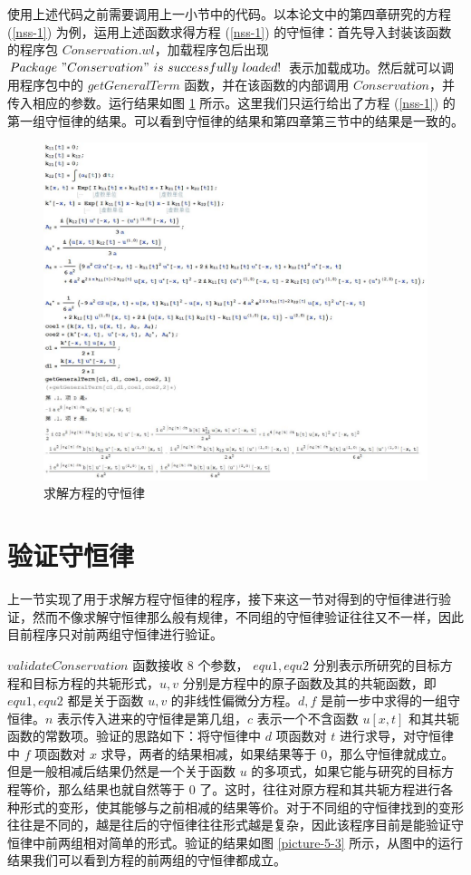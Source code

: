 使用上述代码之前需要调用上一小节中的代码。以本论文中的第四章研究的方程 (\ref{nss-1}) 为例，运用上述函数求得方程 (\ref{nss-1}) 的守恒律：首先导入封装该函数的程序包 $Conservation.wl$，加载程序包后出现 $Package \ "Conservation" \ is \ successfully \  loaded!$ 表示加载成功。然后就可以调用程序包中的 $getGeneralTerm$ 函数，并在该函数的内部调用 $Conservation$，并传入相应的参数。运行结果如图 \ref{picture-5-2} 所示。这里我们只运行给出了方程 (\ref{nss-1}) 的第一组守恒律的结果。可以看到守恒律的结果和第四章第三节中的结果是一致的。
\begin{figure}[!htp]
\centering
\includegraphics[width=\linewidth]{getConservation.jpg}
\caption{求解方程的守恒律}
\label{picture-5-2}
\end{figure}

\section{验证守恒律}
上一节实现了用于求解方程守恒律的程序，接下来这一节对得到的守恒律进行验证，然而不像求解守恒律那么般有规律，不同组的守恒律验证往往又不一样，因此目前程序只对前两组守恒律进行验证。


$validateConservation$ 函数接收 8 个参数， $equ1, equ2$ 分别表示所研究的目标方程和目标方程的共轭形式，$u, v$ 分别是方程中的原子函数及其的共轭函数，即 $equ1, equ2$ 都是关于函数 $u, v$ 的非线性偏微分方程。$d, f$ 是前一步中求得的一组守恒律。$n$ 表示传入进来的守恒律是第几组，$c$ 表示一个不含函数 $u[x,t]$ 和其共轭函数的常数项。验证的思路如下：将守恒律中 $d$ 项函数对 $t$ 进行求导，对守恒律中 $f$ 项函数对 $x$ 求导，两者的结果相减，如果结果等于 0，那么守恒律就成立。但是一般相减后结果仍然是一个关于函数 $u$ 的多项式，如果它能与研究的目标方程等价，那么结果也就自然等于 0 了。这时，往往对原方程和其共轭方程进行各种形式的变形，使其能够与之前相减的结果等价。对于不同组的守恒律找到的变形往往是不同的，越是往后的守恒律往往形式越是复杂，因此该程序目前是能验证守恒律中前两组相对简单的形式。验证的结果如图  \ref{picture-5-3} 所示，从图中的运行结果我们可以看到方程的前两组的守恒律都成立。

